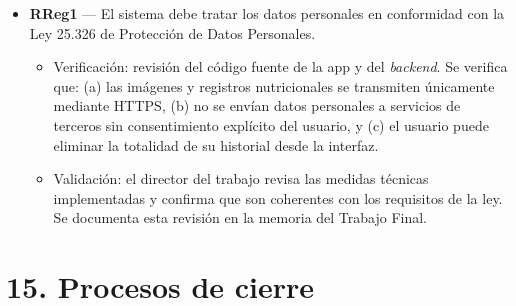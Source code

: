 \documentclass[
11pt, %
]{charter}
\begin{document}
\begin{itemize}
\item \textbf{RReg1} --- El sistema debe tratar los datos personales en conformidad con la Ley 25.326 de Protección de Datos Personales.
\begin{itemize}
	\item Verificación: revisión del código fuente de la app y del \textit{backend}. Se verifica que: (a) las imágenes y registros nutricionales se transmiten únicamente mediante HTTPS, (b) no se envían datos personales a servicios de terceros sin consentimiento explícito del usuario, y (c) el usuario puede eliminar la totalidad de su historial desde la interfaz.
	\item Validación: el director del trabajo revisa las medidas técnicas implementadas y confirma que son coherentes con los requisitos de la ley. Se documenta esta revisión en la memoria del Trabajo Final.
\end{itemize}

\end{itemize}

\section{15. Procesos de cierre}    
\label{sec:cierre}
\end{document}
